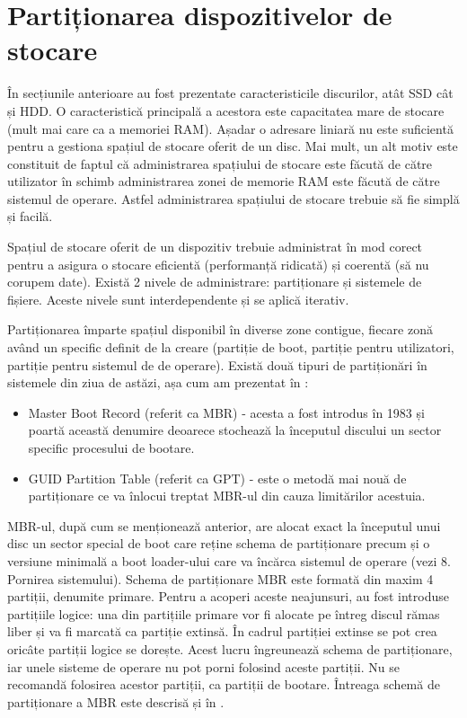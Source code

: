\section{Partiționarea dispozitivelor de stocare}
\label{sec:storage-part}

În secțiunile anterioare au fost prezentate caracteristicile discurilor, atât
SSD cât și HDD. O caracteristică principală a acestora este capacitatea mare de
stocare (mult mai care ca a memoriei RAM). Așadar o adresare liniară nu este
suficientă pentru a gestiona spațiul de stocare oferit de un disc. Mai mult, un
alt motiv este constituit de faptul că administrarea spațiului de stocare este
făcută de către utilizator în schimb administrarea zonei de memorie RAM este
făcută de către sistemul de operare. Astfel administrarea spațiului de stocare
trebuie să fie simplă și facilă.

Spațiul de stocare oferit de un dispozitiv trebuie administrat în mod corect
pentru a asigura o stocare eficientă (performanță ridicată) și coerentă (să nu
corupem date). Există 2 nivele de administrare: partiționare și sistemele de
fișiere. Aceste nivele sunt interdependente și se aplică iterativ.

Partiționarea împarte spațiul disponibil în diverse zone contigue, fiecare zonă
având un specific definit de la creare (partiție de boot, partiție pentru
utilizatori, partiție pentru sistemul de de operare). Există două tipuri de
partiționări în sistemele din ziua de astăzi, așa cum am prezentat în
:

\begin{itemize}
	\item Master Boot Record (referit ca MBR) - acesta a fost introdus în
		1983 și poartă această denumire deoarece stochează la începutul
		discului un sector specific procesului de bootare.
	\item GUID Partition Table (referit ca GPT) - este o metodă mai nouă de
		partiționare ce va înlocui treptat MBR-ul din cauza limitărilor
		acestuia.
\end{itemize}

MBR-ul, după cum se menționează anterior, are alocat exact la începutul unui
disc un sector special de boot care reține schema de partiționare precum și o
versiune minimală a boot loader-ului care va încărca sistemul de operare (vezi
8. Pornirea sistemului). Schema de partiționare MBR este formată din maxim 4
partiții, denumite primare. Pentru a acoperi aceste neajunsuri, au fost
introduse partițiile logice: una din partițiile primare vor fi alocate pe întreg
discul rămas liber și va fi marcată ca partiție extinsă. În cadrul partiției
extinse se pot crea oricâte partiții logice se dorește. Acest lucru îngreunează
schema de partiționare, iar unele sisteme de operare nu pot porni folosind
aceste partiții. Nu se recomandă folosirea acestor partiții, ca partiții de
bootare. Întreaga schemă de partiționare a MBR este descrisă și în
.

